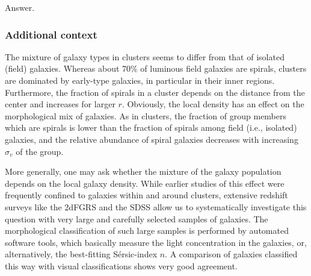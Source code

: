 \documentclass[a4paper,11pt]{article}
\begin{document}
Answer.

\subsubsection{Additional context}

The mixture of galaxy types in clusters seems to differ from that of isolated (field) galaxies. Whereas about 70\% of luminous field galaxies are spirals, clusters are dominated by early-type galaxies, in particular in their inner regions. Furthermore, the fraction of spirals in a cluster depends on the distance from the center and increases for larger $r$. Obviously, the local density has an effect on the morphological mix of galaxies. As in clusters, the fraction of group members which are spirals is lower than the fraction of spirals among field (i.e., isolated) galaxies, and the relative abundance of spiral galaxies decreases with increasing $\sigma_v$ of the group.

{\noindent}More generally, one may ask whether the mixture of the galaxy population depends on the local galaxy density. While earlier studies of this effect were frequently confined to galaxies within and around clusters, extensive redshift surveys like the 2dFGRS and the SDSS allow us to systematically investigate this question with very large and carefully selected samples of galaxies. The morphological classification of such large samples is performed by automated software tools, which basically measure the light concentration in the galaxies, or, alternatively, the best-fitting S\'ersic-index $n$. A comparison of galaxies classified this way with visual classifications shows very good agreement.
\end{document}
